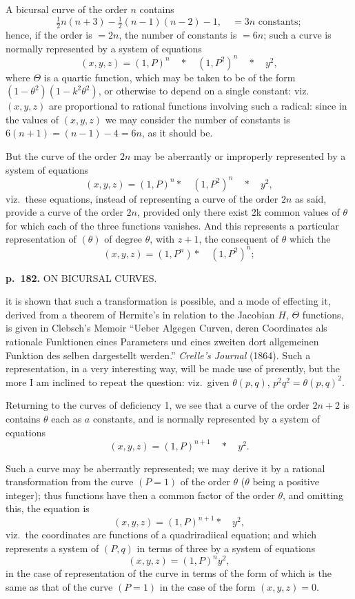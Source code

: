 \documentclass[11pt,a4paper]{article}
\begin{document}
A bicursal curve of the order $n$ contains
\[
\tfrac{1}{2}n(n+3) - \tfrac{1}{2}(n - 1)(n - 2) - 1, \quad = 3n \text{ constants};
\]
hence, if the order is $= 2n$, the number of constants is $= 6n$; such a curve is normally represented by a system of equations
\[
(x, y, z) = (1, P)^n \quad \ast \quad (1, P^2)^n \quad \ast \quad y^2,
\]
where $\Theta$ is a quartic function, which may be taken to be of the form $(1 - \theta^2)(1 - k^2 \theta^2)$, or otherwise to depend on a single constant: viz.\ $(x, y, z)$ are proportional to rational functions involving such a radical: since in the values of $(x, y, z)$ we may consider the number of constants is $6(n + 1) = (n - 1) - 4 = 6n$, as it should be.

But the curve of the order $2n$ may be aberrantly or improperly represented by a system of equations
\[
(x, y, z) = (1, P)^n \ast \quad (1, P^2)^n \quad \ast \quad y^2,
\]
viz.\ these equations, instead of representing a curve of the order $2n$ as said, provide a curve of the order $2n$, provided only there exist 2k common values of $\theta$ for which each of the three functions vanishes.  And this represents a particular representation of $(\theta)$ of degree $\theta$, with $z + 1$, the consequent of $\theta$ which the
\[
(x, y, z) = (1, P^n) \ast \quad (1, P^2)^n;
\]

\clearpage

\noindent
\textbf{p.~182.}  ON BICURSAL CURVES.

it is shown that such a transformation is possible, and a mode of effecting it, derived from a theorem of Hermite's in relation to the Jacobian $H$, $\Theta$ functions, is given in Clebsch's Memoir ``Ueber Algegen Curven, deren Coordinates als rationale Funktionen eines Parameters und eines zweiten dort allgemeinen Funktion des selben dargestellt werden.'' \textit{Crelle's Journal} (1864).  Such a representation, in a very interesting way, will be made use of presently, but the more I am inclined to repeat the question: viz.\ given $\theta(p, q)$, $p^2 q^2 = \theta(p, q)^2$.

Returning to the curves of deficiency 1, we see that a curve of the order $2n + 2$ is contains $\theta$ each as $a$ constants, and is normally represented by a system of equations
\[
(x, y, z) = (1, P)^{n+1} \quad \ast \quad y^2.
\]

Such a curve may be aberrantly represented; we may derive it by a rational transformation from the curve $(P = 1)$ of the order $\theta$ ($\theta$ being a positive integer); thus functions have then a common factor of the order $\theta$, and omitting this, the equation is
\[
(x, y, z) = (1, P)^{n+1} \ast \quad y^2,
\]
viz.\ the coordinates are functions of a quadriradiical equation; and which represents a system of $(P, q)$ in terms of three by a system of equations
\[
(x, y, z) = (1, P)^{n} y^2,
\]
in the case of representation of the curve in terms of the form of which is the same as that of the curve $(P = 1)$ in the case of the form $(x, y, z) = 0$.
\end{document}
